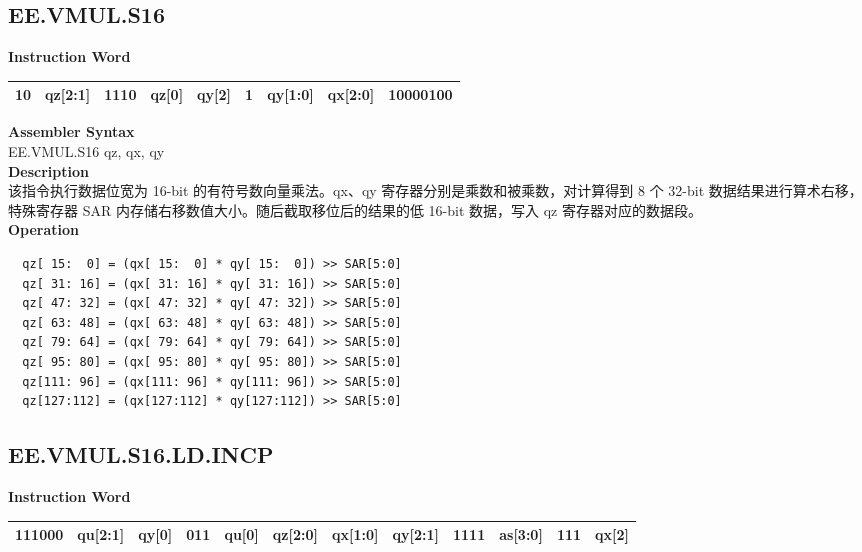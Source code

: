 \clearpage
\subsection{EE.VMUL.S16}\label{instruction:EEVMULS16}
\setlength\tabcolsep{6pt}
\textbf{Instruction Word} \\
\begin{tabular}{|c|c|c|c|c|c|c|c|c|}
	\hline
	10 & qz[2:1] & 1110 & qz[0] & qy[2] & 1 & qy[1:0] & qx[2:0] & 10000100 \\
	\hline
\end{tabular}

\textbf{Assembler Syntax} \\
EE.VMUL.S16 qz, qx, qy \\
\textbf{Description} \\
该指令执行数据位宽为 16-bit 的有符号数向量乘法。qx、qy 寄存器分别是乘数和被乘数，对计算得到 8 个 32-bit 数据结果进行算术右移，特殊寄存器 SAR 内存储右移数值大小。随后截取移位后的结果的低 16-bit 数据，写入 qz 寄存器对应的数据段。\\
\textbf{Operation}
\begin{lstlisting}
  qz[ 15:  0] = (qx[ 15:  0] * qy[ 15:  0]) >> SAR[5:0]
  qz[ 31: 16] = (qx[ 31: 16] * qy[ 31: 16]) >> SAR[5:0]
  qz[ 47: 32] = (qx[ 47: 32] * qy[ 47: 32]) >> SAR[5:0]
  qz[ 63: 48] = (qx[ 63: 48] * qy[ 63: 48]) >> SAR[5:0]
  qz[ 79: 64] = (qx[ 79: 64] * qy[ 79: 64]) >> SAR[5:0]
  qz[ 95: 80] = (qx[ 95: 80] * qy[ 95: 80]) >> SAR[5:0]
  qz[111: 96] = (qx[111: 96] * qy[111: 96]) >> SAR[5:0]
  qz[127:112] = (qx[127:112] * qy[127:112]) >> SAR[5:0]
\end{lstlisting}

\clearpage
\subsection{EE.VMUL.S16.LD.INCP}\label{instruction:EEVMULS16LDINCP}
\setlength\tabcolsep{6pt}
\textbf{Instruction Word} \\
\begin{tabular}{|c|c|c|c|c|c|c|c|c|c|c|c|}
	\hline
	111000 & qu[2:1] & qy[0] & 011 & qu[0] & qz[2:0] & qx[1:0] & qy[2:1] & 1111 & as[3:0] & 111 & qx[2] \\
	\hline
\end{tabular}

